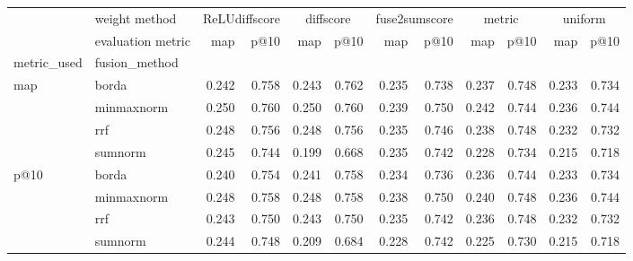 \begin{tabular}{llrrrrrrrrrr}
\toprule
 & weight method & \multicolumn{2}{c}{ReLUdiffscore} & \multicolumn{2}{c}{diffscore} & \multicolumn{2}{c}{fuse2sumscore} & \multicolumn{2}{c}{metric} & \multicolumn{2}{c}{uniform} \\
 & evaluation metric & map & p@10 & map & p@10 & map & p@10 & map & p@10 & map & p@10 \\
metric_used & fusion_method &  &  &  &  &  &  &  &  &  &  \\
\midrule
\multirow[t]{4}{*}{map} & borda & 0.242 & 0.758 & 0.243 & 0.762 & 0.235 & 0.738 & 0.237 & 0.748 & 0.233 & 0.734 \\
 & minmaxnorm & 0.250 & 0.760 & 0.250 & 0.760 & 0.239 & 0.750 & 0.242 & 0.744 & 0.236 & 0.744 \\
 & rrf & 0.248 & 0.756 & 0.248 & 0.756 & 0.235 & 0.746 & 0.238 & 0.748 & 0.232 & 0.732 \\
 & sumnorm & 0.245 & 0.744 & 0.199 & 0.668 & 0.235 & 0.742 & 0.228 & 0.734 & 0.215 & 0.718 \\
\cline{1-12}
\multirow[t]{4}{*}{p@10} & borda & 0.240 & 0.754 & 0.241 & 0.758 & 0.234 & 0.736 & 0.236 & 0.744 & 0.233 & 0.734 \\
 & minmaxnorm & 0.248 & 0.758 & 0.248 & 0.758 & 0.238 & 0.750 & 0.240 & 0.748 & 0.236 & 0.744 \\
 & rrf & 0.243 & 0.750 & 0.243 & 0.750 & 0.235 & 0.742 & 0.236 & 0.748 & 0.232 & 0.732 \\
 & sumnorm & 0.244 & 0.748 & 0.209 & 0.684 & 0.228 & 0.742 & 0.225 & 0.730 & 0.215 & 0.718 \\
\cline{1-12}
\bottomrule
\end{tabular}
